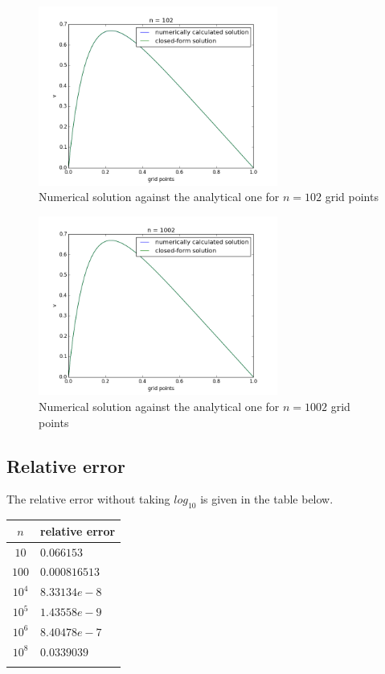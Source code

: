 \documentclass[a4paper,norsk,12pt,oneside]{article}
\begin{document}
\begin{figure}[H]
            \centering %
            \includegraphics[width=0.7\textwidth]{blabla_102.png}
            \caption{Numerical solution against the analytical one for \(n = 102\) grid points} 
            \end{figure}   

 \begin{figure}[H]
            \centering %
            \includegraphics[width=0.7\textwidth]{blabla_1002.png}
            \caption{Numerical solution against the analytical one for \(n = 1002\) grid points} 
            \end{figure}  

\subsection{Relative error}

The relative error without taking \(log_{10}\)
is given in the table below. 

\begin{tabular}{c | l  }
    \label{pos_mikro}
    \(n\) & relative error \\ \hline
    \(10\) & \(0.066153\) \\ 
    \(100\) & \(0.000816513\)\\
    \(10^4\) & \(8.33134 e-8\)\\
    \(10^5\) & \(1.43558 e-9\)\\
    \(10^6\) & \(8.40478 e-7\)\\
    \(10^8\) & \(0.0339039\) \\\\
    \end{tabular} 
\end{document}
